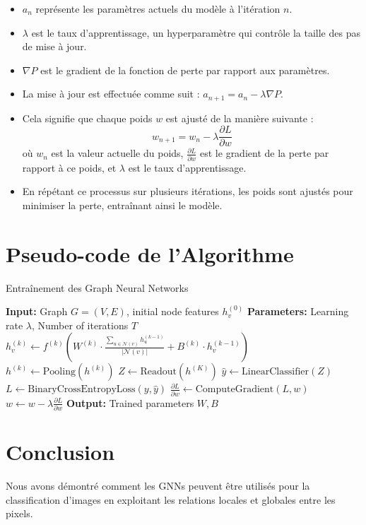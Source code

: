 \documentclass{article}
\begin{document}
\begin{itemize}
    \item \( a_n \) représente les paramètres actuels du modèle à l'itération \( n \).
    \item \( \lambda \) est le taux d'apprentissage, un hyperparamètre qui contrôle la taille des pas de mise à jour.
    \item \( \nabla P \) est le gradient de la fonction de perte par rapport aux paramètres.
    \item La mise à jour est effectuée comme suit : \( a_{n+1} = a_n - \lambda \nabla P \).
    \item Cela signifie que chaque poids \( w \) est ajusté de la manière suivante :
    \[
    w_{n+1} = w_n - \lambda \frac{\partial L}{\partial w}
    \]
    où \( w_n \) est la valeur actuelle du poids, \( \frac{\partial L}{\partial w} \) est le gradient de la perte par rapport à ce poids, et \( \lambda \) est le taux d'apprentissage.
    \item En répétant ce processus sur plusieurs itérations, les poids sont ajustés pour minimiser la perte, entraînant ainsi le modèle.
\end{itemize}
\section{Pseudo-code de l'Algorithme}
\begin{algorithm}
\caption{Entraînement des Graph Neural Networks}
\begin{algorithmic}[1]
    \State \textbf{Input:} Graph $G = (V, E)$, initial node features $h_v^{(0)}$
    \State \textbf{Parameters:} Learning rate $\lambda$, Number of iterations $T$
                \State $h_v^{(k)} \leftarrow f^{(k)} \left( W^{(k)} \cdot \frac{\sum_{u \in \mathcal{N}(v)} h_u^{(k-1)}}{|\mathcal{N}(v)|} + B^{(k)} \cdot h_v^{(k-1)} \right)$
            \EndFor
            \State $h^{(k)} \leftarrow \text{Pooling}(h^{(k)})$ 
        \EndFor
        \State $Z \leftarrow \text{Readout}(h^{(K)})$ 
        \State $\hat{y} \leftarrow \text{LinearClassifier}(Z)$ 
        \State $L \leftarrow \text{BinaryCrossEntropyLoss}(y, \hat{y})$ 
            \State $\frac{\partial L}{\partial w} \leftarrow \text{ComputeGradient}(L, w)$ 
            \State $w \leftarrow w - \lambda \frac{\partial L}{\partial w}$ 
        \EndFor
    \EndFor
    \State \textbf{Output:} Trained parameters $W, B$
\end{algorithmic}
\end{algorithm}

\section*{Conclusion}
Nous avons démontré comment les GNNs peuvent être utilisés pour la classification d'images en exploitant les relations locales et globales entre les pixels. 
\end{document}

